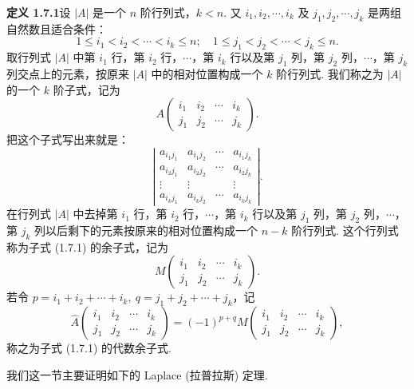 \documentclass[UTF8, 12pt, fontset=fandol, oneside]{ctexart}
\begin{document}
\noindent\textbf{定义 1.7.1}\quad 设 $|A|$ 是一个 $n$ 阶行列式，$k<n$. 又 $i_1,i_2,\cdots,i_k$ 及 $j_1,j_2,\cdots,j_k$ 是两组自然数且适合条件：
\[
1\le i_1<i_2<\cdots<i_k\le n;\quad
1\le j_1<j_2<\cdots<j_k\le n.
\]
取行列式 $|A|$ 中第 $i_1$ 行，第 $i_2$ 行，$\cdots$，第 $i_k$ 行以及第 $j_1$ 列，第 $j_2$ 列，$\cdots$，第 $j_k$ 列交点上的元素，按原来 $|A|$ 中的相对位置构成一个 $k$ 阶行列式. 我们称之为 $|A|$ 的一个 $k$ 阶子式，记为
\begin{equation}
A\left(\begin{array}{cccc}
i_1 & i_2 & \cdots & i_k\\
j_1 & j_2 & \cdots & j_k
\end{array}\right).
\tag{1.7.1}
\end{equation}
把这个子式写出来就是：
\[
\left|\begin{array}{cccc}
a_{i_1j_1} & a_{i_1j_2} & \cdots & a_{i_1j_k}\\
a_{i_2j_1} & a_{i_2j_2} & \cdots & a_{i_2j_k}\\
\vdots & \vdots & & \vdots\\
a_{i_kj_1} & a_{i_kj_2} & \cdots & a_{i_kj_k}
\end{array}\right|.
\]
在行列式 $|A|$ 中去掉第 $i_1$ 行，第 $i_2$ 行，$\cdots$，第 $i_k$ 行以及第 $j_1$ 列，第 $j_2$ 列，$\cdots$，第 $j_k$ 列以后剩下的元素按原来的相对位置构成一个 $n-k$ 阶行列式. 这个行列式称为子式 (1.7.1) 的余子式，记为
\begin{equation}
M\left(\begin{array}{cccc}
i_1 & i_2 & \cdots & i_k\\
j_1 & j_2 & \cdots & j_k
\end{array}\right).
\tag{1.7.2}
\end{equation}
若令 $p=i_1+i_2+\cdots+i_k,\ q=j_1+j_2+\cdots+j_k$，记
\begin{equation}
\widehat{A}\left(\begin{array}{cccc}
i_1 & i_2 & \cdots & i_k\\
j_1 & j_2 & \cdots & j_k
\end{array}\right)
=(-1)^{p+q}
M\left(\begin{array}{cccc}
i_1 & i_2 & \cdots & i_k\\
j_1 & j_2 & \cdots & j_k
\end{array}\right),
\tag{1.7.3}
\end{equation}
称之为子式 (1.7.1) 的代数余子式.

我们这一节主要证明如下的 Laplace (拉普拉斯) 定理.
\end{document}
